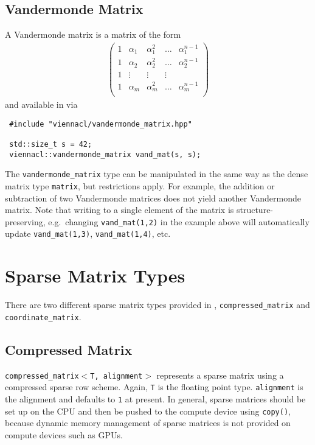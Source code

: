 \subsection{Vandermonde Matrix}
A Vandermonde matrix is a matrix of the form
\begin{align*}
 \left( \begin{array}{ccccc}
         1 & \alpha_1 & \alpha_1^2 & \ldots & \alpha_1^{n-1} \\
         1 & \alpha_2 & \alpha_2^2 & \ldots & \alpha_2^{n-1} \\
         1 & \vdots & \vdots & \vdots \\
         1 & \alpha_m & \alpha_m^2 & \ldots & \alpha_m^{n-1} \\
        \end{array} \right)
\end{align*}
and available in {\ViennaCL} via
\begin{lstlisting}
 #include "viennacl/vandermonde_matrix.hpp"

 std::size_t s = 42;
 viennacl::vandermonde_matrix vand_mat(s, s);
\end{lstlisting}
The \lstinline|vandermonde_matrix| type can be manipulated in the same way as the dense matrix type \lstinline|matrix|, but restrictions apply. For
example, the addition or subtraction of two Vandermonde matrices does not yield another Vandermonde matrix. Note that writing to a single element of
the matrix is structure-preserving, e.g.~changing \lstinline|vand_mat(1,2)| in the example above will automatically update \lstinline|vand_mat(1,3)|,
\lstinline|vand_mat(1,4)|, etc.


\section{Sparse Matrix Types}

There are two different sparse matrix types provided in {\ViennaCL}, \texttt{compressed\_matrix} and \texttt{coordinate\_matrix}.


\subsection{Compressed Matrix}
\texttt{compressed\_matrix$<$T, alignment$>$} represents a sparse
matrix using a compressed sparse row scheme. Again, \texttt{T} is the floating point type. \texttt{alignment} is the alignment and defaults to \texttt{1} at present.
In general, sparse matrices should be set up on the
CPU and then be pushed to the compute device using \texttt{copy()}, because dynamic memory management of sparse matrices is not provided on {\OpenCL} compute devices such as GPUs.

